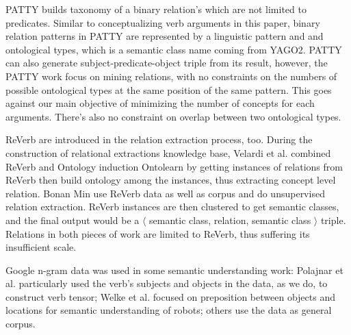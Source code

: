 PATTY\cite{nakashole2012patty} builds taxonomy of a binary relation's
which are not limited to predicates.
Similar to conceptualizing verb arguments in this paper,
binary relation patterns in PATTY are represented by
a linguistic pattern and and ontological types, which is
a semantic class name coming from YAGO2\cite{SuchanekKW07}.
PATTY can also generate subject-predicate-object triple from
its result\cite{nakashole2013discovering}, however, the PATTY
work focus on mining relations, with no constraints on the
numbers of possible ontological types at the same position of
the same pattern. This goes against our main objective of minimizing
the number of concepts for each arguments.
There's also no constraint on overlap between two ontological
types.

ReVerb are introduced in the relation extraction process, too.
During the construction of relational extractions knowledge base,
Velardi et al.\cite{velardi2013open} combined ReVerb and Ontology
induction Ontolearn by getting instances of relations from ReVerb
then build ontology among the instances, thus extracting concept
level relation. Bonan Min\cite{min2012ensemble} use ReVerb data
as well as corpus and do unsupervised relation extraction.
ReVerb instances are then clustered to get semantic classes,
and the final output would be a $\langle$ semantic class,
relation, semantic class $\rangle$ triple. Relations in
both pieces of work are limited to ReVerb, thus suffering
its insufficient scale.


Google n-gram data was used in some semantic understanding work:
Polajnar et al.\cite{polajnar2013learning} particularly used the
verb's subjects and objects in the data, as we do,
to construct verb tensor; Welke et al.\cite{welkegrounded} focused
on preposition between objects and locations for semantic
understanding of robots; others
\cite{borin2013mining,riedlscaling,kaiserextracting}
use the data as general corpus.




